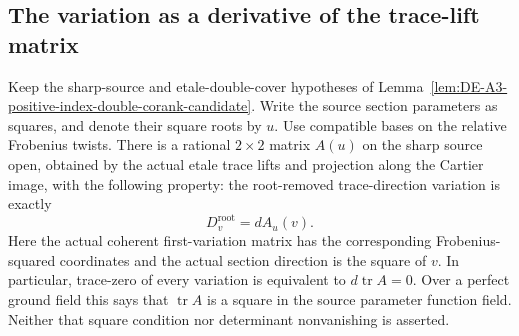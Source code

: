 \subsection{The variation as a derivative of the trace-lift matrix}

\begin{lemma}
\label{lem:DE-A3-positive-cup-derivative-candidate}
Keep the sharp-source and etale-double-cover hypotheses of
Lemma~\ref{lem:DE-A3-positive-index-double-corank-candidate}.
Write the source section parameters as squares, and denote their
square roots by $u$. Use compatible bases on the relative Frobenius
twists. There is a rational $2\times2$ matrix $A(u)$ on the sharp
source open, obtained by the actual etale trace lifts and projection
along the Cartier image, with the following property: the root-removed
trace-direction variation is exactly
\[
                         D^{\mathrm{root}}_v=dA_u(v).
                                                        \tag{DE-CD1}
\]
Here the actual coherent first-variation matrix has the corresponding
Frobenius-squared coordinates and the actual section direction is the
square of $v$. In particular, trace-zero of every variation is equivalent
to $d\operatorname{tr}A=0$. Over a perfect ground field this says that
$\operatorname{tr}A$ is a square in the source parameter function field.
Neither that square condition nor determinant nonvanishing is asserted.
\end{lemma}
